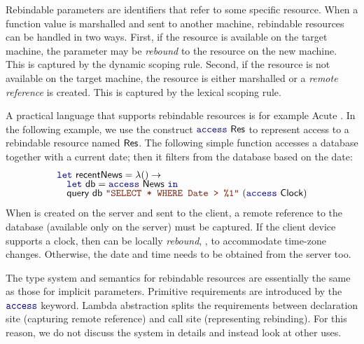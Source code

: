 Rebindable parameters are identifiers that refer to some specific resource. When a function value
is marshalled and sent to another machine, rebindable resources can be handled in two ways. 
First, if the resource is available on the target machine, the parameter may be \emph{rebound} to
the resource on the new machine. This is captured by the dynamic scoping rule. Second, if the 
resource is not available on the target machine, the resource is either marshalled or a \emph{remote 
reference} is created. This is captured by the lexical scoping rule.

A practical language that supports rebindable resources is for example Acute \cite{app-distributed-acute}.
In the following example, we use the construct $\kvd{access}~\ident{Res}$ to represent
access to a rebindable resource named $\textnormal{\sffamily Res}$. The following simple function accesses
a database together with a current date; then it filters from the database based on the date:
%
\begin{equation*}
\begin{array}{l}
 \kvd{let}~\ident{recentNews} = \lambda () \rightarrow\\[-0.25em]
 \quad\kvd{let}~\ident{db} = \kvd{access}~\ident{News}~\kvd{in}\\[-0.25em]
 \quad\ident{query}~\ident{db}~\str{SELECT * WHERE Date > \%1}~(\kvd{access}~\ident{Clock})
\end{array}
\end{equation*}
%
When  is created on the server and sent to the client, a remote reference to 
the database (available only on the server) must be captured. If the client device supports a 
clock, then  can be locally \emph{rebound}, \eg, to accommodate time-zone changes. 
Otherwise, the date and time needs to be obtained from the server too.

The type system and semantics for rebindable resources are essentially the same as those for
implicit parameters. Primitive requirements are introduced by the $\kvd{access}$ keyword. 
Lambda abstraction splits the requirements between declaration site (capturing remote reference) 
and call site (representing rebinding). For this reason, we do not discuss the system in details
and instead look at other uses.


